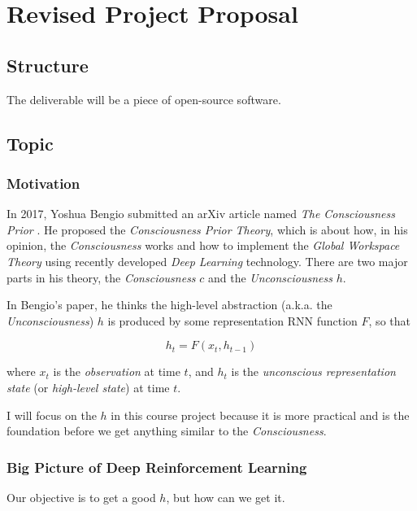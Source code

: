 



\section{Revised Project Proposal}

\subsection{Structure}
The deliverable will be a piece of open-source software.

\subsection{Topic}

\subsubsection{Motivation}
In 2017, Yoshua Bengio submitted an arXiv article named \emph{The Consciousness Prior} \cite{bengio_consciousness_2019}. 
He proposed the \emph{Consciousness Prior Theory}, which is about how, in his opinion, the \emph{Consciousness} works and how to implement the \emph{Global Workspace Theory} using recently developed \emph{Deep Learning} technology.
There are two major parts in his theory, the \emph{Consciousness} $c$ and the \emph{Unconsciousness} $h$.

In Bengio's paper, he thinks the high-level abstraction (a.k.a. the \emph{Unconsciousness}) $h$ is produced by some representation RNN function $F$, so that

\begin{equation*}
    h_t = F(x_t, h_{t-1})
\end{equation*}

where $x_t$ is the \emph{observation} at time $t$, and $h_{t}$ is the \emph{unconscious representation state} (or \emph{high-level state}) at time $t$.

I will focus on the $h$ in this course project because it is more practical and is the foundation before we get anything similar to the \emph{Consciousness}.

\subsubsection{Big Picture of Deep Reinforcement Learning}
Our objective is to get a good $h$, but how can we get it.

